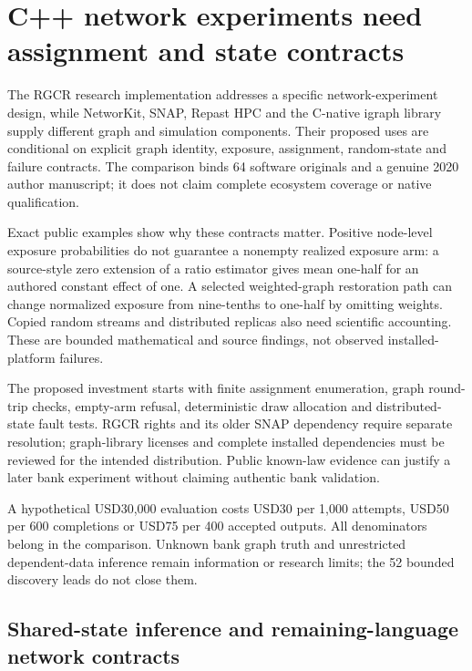 \hypertarget{c-network-experiments-need-assignment-and-state-contracts}{%
\section{C++ network experiments need assignment and state
contracts}\label{c-network-experiments-need-assignment-and-state-contracts}}

The RGCR research implementation addresses a specific network-experiment
design, while NetworKit, SNAP, Repast HPC and the C-native igraph
library supply different graph and simulation components. Their proposed
uses are conditional on explicit graph identity, exposure, assignment,
random-state and failure contracts. The comparison binds 64 software
originals and a genuine 2020 author manuscript; it does not claim
complete ecosystem coverage or native qualification.
\citep{exec25_cnet_rgcr,exec25_cnet_networkit,exec25_cnet_snap,exec25_cnet_repast,exec25_cnet_igraph,exec25_cnet_paper}

Exact public examples show why these contracts matter. Positive
node-level exposure probabilities do not guarantee a nonempty realized
exposure arm: a source-style zero extension of a ratio estimator gives
mean one-half for an authored constant effect of one. A selected
weighted-graph restoration path can change normalized exposure from
nine-tenths to one-half by omitting weights. Copied random streams and
distributed replicas also need scientific accounting. These are bounded
mathematical and source findings, not observed installed-platform
failures. \citep{exec25_cnet_choice}

The proposed investment starts with finite assignment enumeration, graph
round-trip checks, empty-arm refusal, deterministic draw allocation and
distributed-state fault tests. RGCR rights and its older SNAP dependency
require separate resolution; graph-library licenses and complete
installed dependencies must be reviewed for the intended distribution.
Public known-law evidence can justify a later bank experiment without
claiming authentic bank validation. \citep{exec25_cnet_choice}

A hypothetical USD30,000 evaluation costs USD30 per 1,000 attempts,
USD50 per 600 completions or USD75 per 400 accepted outputs. All
denominators belong in the comparison. Unknown bank graph truth and
unrestricted dependent-data inference remain information or research
limits; the 52 bounded discovery leads do not close them.
\citep{exec25_cnet_choice}

\hypertarget{shared-state-inference-and-remaining-language-network-contracts}{%
\subsection{Shared-state inference and remaining-language network
contracts}\label{shared-state-inference-and-remaining-language-network-contracts}}

